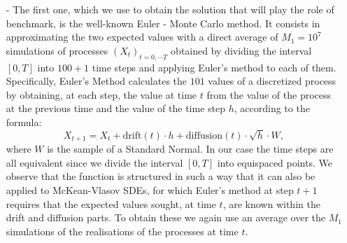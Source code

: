 \documentclass[a4paper,11pt,openright]{report}
\begin{document}
\begin{itemize}
\item[-] The first one, which we use to obtain the solution that will play the role of benchmark, is the well-known Euler - Monte Carlo method. It consists in approximating the two expected values with a direct average of $M_1 = 10^7$ simulations of processes $(X_t)_{t=0, \cdots T}$ obtained by dividing the interval $[0,T]$ into $100+1$ time steps and applying Euler's method to each of them. Specifically, Euler's Method calculates the $101$ values of a discretized process by obtaining, at each step, the value at time $t$ from the value of the process at the previous time and the value of the time step $h$, according to the formula:
\[
X_{t+1} = X_t + \mathrm{drift}(t) \cdot h + \mathrm{diffusion}(t) \cdot \sqrt{h} \cdot W, 
\]
where $W$ is the sample of a Standard Normal. In our case the time steps are all equivalent since we divide the interval $[0,T]$ into equispaced points. We observe that the function is structured in such a way that it can also be applied to McKean-Vlasov SDEs, for which Euler's method at step $t+1$ requires that the expected values sought, at time $t$, are known within the drift and diffusion parts. To obtain these we again use an average over the $M_1$ simulations of the realisations of the processes at time $t$.


\end{itemize}
\end{document}
